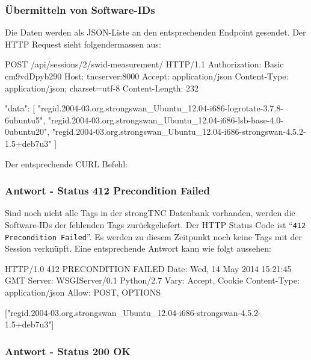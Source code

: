 \subsubsection*{Übermitteln von Software-IDs}
Die Daten werden als JSON-Liste an den entsprechenden Endpoint gesendet.
Der HTTP Request sieht folgendermassen aus:

\begin{httpcode}
POST /api/sessions/2/swid-measurement/ HTTP/1.1
Authorization: Basic cm9vdDpyb290
Host: tncserver:8000
Accept: application/json
Content-Type: application/json; charset=utf-8
Content-Length: 232

{
	"data":
	[
		"regid.2004-03.org.strongswan_Ubuntu_12.04-i686-logrotate-3.7.8-6ubuntu5",
		"regid.2004-03.org.strongswan_Ubuntu_12.04-i686-lsb-base-4.0-0ubuntu20",
		"regid.2004-03.org.strongswan_Ubuntu_12.04-i686-strongswan-4.5.2-1.5+deb7u3"
	]
}
\end{httpcode}

Der entsprechende CURL Befehl:


\subsubsection*{Antwort - Status 412 Precondition Failed}

Sind noch nicht alle Tags in der strongTNC Datenbank vorhanden, werden die
Software-IDs der fehlenden Tags zurückgeliefert. Der HTTP Status Code ist
``\texttt{412 Precondition Failed}''. Es werden zu diesem Zeitpunkt noch keine
Tags mit der Session verknüpft. Eine entsprechende Antwort kann wie folgt
aussehen:

\begin{httpcode}
HTTP/1.0 412 PRECONDITION FAILED
Date: Wed, 14 May 2014 15:21:45 GMT
Server: WSGIServer/0.1 Python/2.7
Vary: Accept, Cookie
Content-Type: application/json
Allow: POST, OPTIONS

["regid.2004-03.org.strongswan_Ubuntu_12.04-i686-strongswan-4.5.2-1.5+deb7u3"]
\end{httpcode}

\subsubsection*{Antwort - Status 200 OK}

